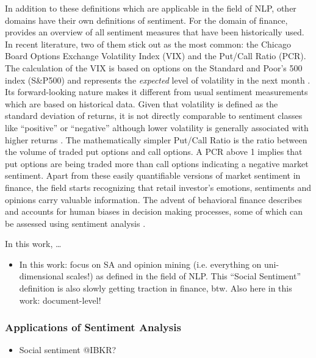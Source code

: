 In addition to these definitions which are applicable in the field of NLP, other domains have their own definitions of sentiment. For the domain of finance,  provides an overview of all sentiment measures that have been historically used. In recent literature, two of them stick out as the most common: the Chicago Board Options Exchange Volatility Index (VIX) and the Put/Call Ratio (PCR). The calculation of the VIX is based on options on the Standard and Poor's 500 index (S\&P500) and represents the \emph{expected} level of volatility in the next month . Its forward-looking nature makes it different from usual sentiment measurements which are based on historical data. Given that volatility is defined as the standard deviation of returns, it is not directly comparable to sentiment classes like ``positive'' or ``negative'' although lower volatility is generally associated with higher returns . The mathematically simpler Put/Call Ratio is the ratio between the volume of traded put options and call options. A PCR above 1 implies that put options are being traded more than call options indicating a negative market sentiment. Apart from these easily quantifiable versions of market sentiment in finance, the field starts recognizing that retail investor's emotions, sentiments and opinions carry valuable information. The advent of behavioral finance describes and accounts for human biases in decision making processes, some of which can be assessed using sentiment analysis .

In this work, \dots 

\begin{itemize}[noitemsep]
	\item In this work: focus on SA and opinion mining (i.e. everything on uni-dimensional scales!) as defined in the field of NLP. This ``Social Sentiment'' definition is also slowly getting traction in finance, btw. Also here in this work: document-level!
\end{itemize}


\newpage %




\subsubsection{Applications of Sentiment Analysis}

\begin{itemize}
	\item Social sentiment @IBKR?
\end{itemize}


